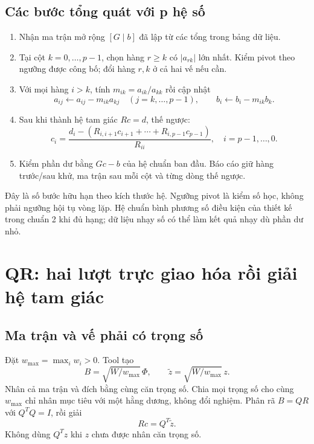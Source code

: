 \subsection{Các bước tổng quát với p hệ số}
\begin{enumerate}
\item Nhận ma trận mở rộng $[G\mid b]$ đã lập từ các tổng trong bảng dữ liệu.
\item Tại cột $k=0,\ldots,p-1$, chọn hàng $r\ge k$ có $|a_{rk}|$ lớn nhất. Kiểm pivot theo ngưỡng được công bố; đổi hàng $r,k$ ở cả hai vế nếu cần.
\item Với mọi hàng $i>k$, tính $m_{ik}=a_{ik}/a_{kk}$ rồi cập nhật
\[
a_{ij}\leftarrow a_{ij}-m_{ik}a_{kj}\quad(j=k,\ldots,p-1),\qquad
b_i\leftarrow b_i-m_{ik}b_k.
\]
\item Sau khi thành hệ tam giác $Rc=d$, thế ngược:
\[
c_i=\frac{d_i-(R_{i,i+1}c_{i+1}+\cdots+R_{i,p-1}c_{p-1})}{R_{ii}},
\quad i=p-1,\ldots,0.
\]
\item Kiểm phần dư bằng $Gc-b$ của hệ chuẩn ban đầu. Báo cáo giữ hàng trước/sau khử, ma trận sau mỗi cột và từng dòng thế ngược.
\end{enumerate}
Đây là số bước hữu hạn theo kích thước hệ. Ngưỡng pivot là kiểm số học, không phải ngưỡng hội tụ vòng lặp. Hệ chuẩn bình phương số điều kiện của thiết kế trong chuẩn 2 khi đủ hạng; dữ liệu nhạy số có thể làm kết quả nhạy dù phần dư nhỏ.

\section{QR: hai lượt trực giao hóa rồi giải hệ tam giác}
\label{sec:ls-qr}
\subsection{Ma trận và vế phải có trọng số}
Đặt $w_{\max}=\max_iw_i>0$. Tool tạo
\[
B=\sqrt{W/w_{\max}}\,\Phi,\qquad
\widetilde z=\sqrt{W/w_{\max}}\,z.
\]
Nhân cả ma trận và đích bằng cùng căn trọng số. Chia mọi trọng số cho cùng $w_{\max}$ chỉ nhân mục tiêu với một hằng dương, không đổi nghiệm. Phân rã $B=QR$ với $Q^TQ=I$, rồi giải
\[
\boxed{Rc=Q^T\widetilde z.}
\]
Không dùng $Q^Tz$ khi $z$ chưa được nhân căn trọng số.

